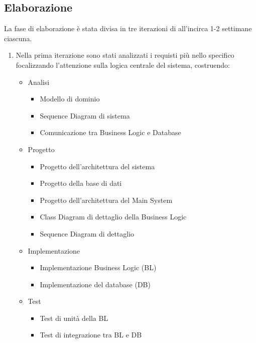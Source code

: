 \subsection{Elaborazione}
La fase di elaborazione è stata divisa in tre iterazioni di all'incirca 1-2 settimane ciascuna.
\begin{enumerate}
	\item Nella prima iterazione sono stati analizzati i requisti più nello specifico focalizzando l'attenzione sulla logica centrale del sistema, costruendo:
	\begin{itemize}
		\item Analisi
		\begin{itemize}
			\item Modello di dominio
			\item Sequence Diagram di sistema
			\item Comunicazione tra Business Logic e Database
		\end{itemize}
		\item Progetto
		\begin{itemize}
			\item Progetto dell'architettura del sistema
			\item Progetto della base di dati
			\item Progetto dell'architettura del Main System
			\item Class Diagram di dettaglio della Business Logic
			\item Sequence Diagram di dettaglio
		\end{itemize}
		\item Implementazione
		\begin{itemize}
			\item Implementazione Business Logic (BL)
			\item Implementazione del database (DB)
		\end{itemize}
		\item Test
		\begin{itemize}
			\item Test di unità della BL
			\item Test di integrazione tra BL e DB
		\end{itemize}
	\end{itemize}


\end{enumerate}
